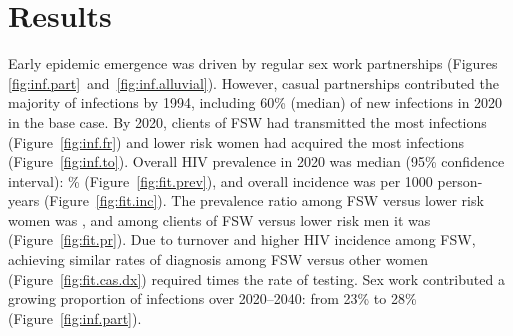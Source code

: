 \clearpage
\section{Results}\label{res}
Early epidemic emergence was driven by regular sex work partnerships
(Figures \ref{fig:inf.part}~and~\ref{fig:inf.alluvial}).
However, casual partnerships contributed the majority of infections by 1994, %
including 60\% (median) of new infections in 2020 in the base case. %
By 2020, clients of FSW had transmitted the most infections (Figure~\ref{fig:inf.fr})
and lower risk women had acquired the most infections (Figure~\ref{fig:inf.to}).
Overall HIV prevalence in 2020 was median (95\% confidence interval):
\% (Figure~\ref{fig:fit.prev}),
and overall incidence was  per 1000 person-years (Figure~\ref{fig:fit.inc}).
The prevalence ratio among FSW versus lower risk women was ,
and among clients of FSW versus lower risk men it was  (Figure~\ref{fig:fit.pr}).
Due to turnover and higher HIV incidence among FSW,
achieving similar rates of diagnosis among FSW versus other women (Figure~\ref{fig:fit.cas.dx})
required  times the rate of testing.
Sex work contributed a growing proportion of infections
over 2020--2040: from 23\% to 28\% (Figure~\ref{fig:inf.part}). %
